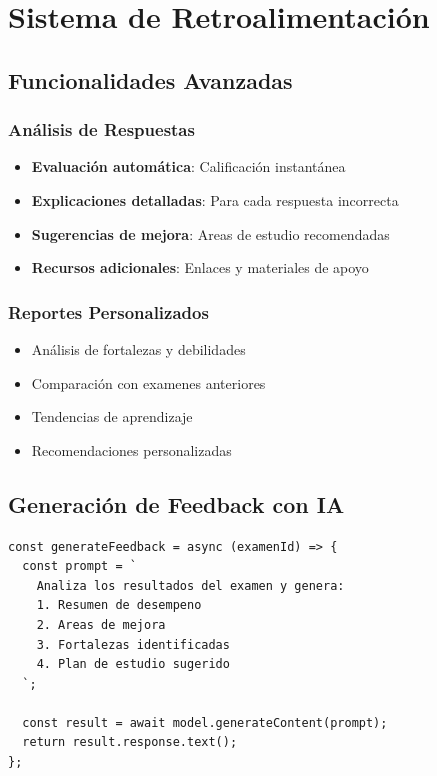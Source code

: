 \documentclass[12pt,a4paper]{report}
\begin{document}
\section{Sistema de Retroalimentación}

\subsection{Funcionalidades Avanzadas}

\subsubsection{Análisis de Respuestas}
\begin{itemize}
    \item \textbf{Evaluación automática}: Calificación instantánea
    \item \textbf{Explicaciones detalladas}: Para cada respuesta incorrecta
    \item \textbf{Sugerencias de mejora}: Areas de estudio recomendadas
    \item \textbf{Recursos adicionales}: Enlaces y materiales de apoyo
\end{itemize}

\subsubsection{Reportes Personalizados}
\begin{itemize}
    \item Análisis de fortalezas y debilidades
    \item Comparación con examenes anteriores
    \item Tendencias de aprendizaje
    \item Recomendaciones personalizadas
\end{itemize}

\subsection{Generación de Feedback con IA}

\begin{lstlisting}
const generateFeedback = async (examenId) => {
  const prompt = `
    Analiza los resultados del examen y genera:
    1. Resumen de desempeno
    2. Areas de mejora
    3. Fortalezas identificadas
    4. Plan de estudio sugerido
  `;
  
  const result = await model.generateContent(prompt);
  return result.response.text();
};
\end{lstlisting}
\end{document}
